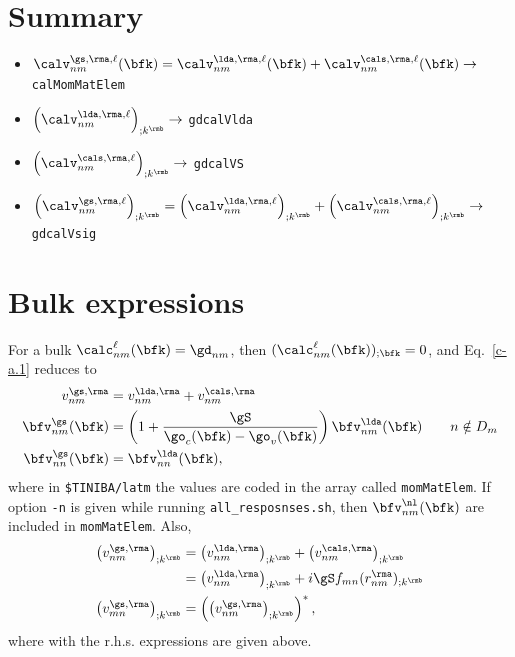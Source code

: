 \section{Summary}
\begin{itemize}
\item
$\calv^{\gs,\rma,\ell}_{nm}(\bfk)=\calv^{\lda,\rma,\ell}_{nm}(\bfk)+\calv^{\cals,\rma,\ell}_{nm}(\bfk)\to$
\verb=calMomMatElem= 

\item $\left(\calv^{\lda,\rma,\ell}_{nm}\right)_{;k^\rmb}\to$
\verb=gdcalVlda= 

\item $\left(\calv^{\cals,\rma,\ell}_{nm}\right)_{;k^\rmb}\to$ 
\verb=gdcalVS=

\item $\left(\calv^{\gs,\rma,\ell}_{nm}\right)_{;k^\rmb}=
\left(\calv^{\lda,\rma,\ell}_{nm}\right)_{;k^\rmb}+\left(\calv^{\cals,\rma,\ell}_{nm}\right)_{;k^\rmb}\to$ 
\verb=gdcalVsig=
\end{itemize}

\section{Bulk expressions}

For a bulk $\calc^\ell_{nm}(\bfk)=\gd_{nm}$, then
$(\calc^\ell_{nm}(\bfk))_{;\bfk}=0$, and Eq.~\eqref{c-a.1} reduces to
\begin{align}\label{choni.9}
v^{\gs,\rma}_{nm}
&=
v^{\lda,\rma}_{nm}
+
v^{\cals,\rma}_{nm}
\nonumber\\
\bfv^\gs_{nm}(\bfk)
&=
\left(1+\frac{\gS}{\go_c(\bfk)-\go_v(\bfk)}\right)\bfv^\lda_{nm}(\bfk)
\quad\quad n\notin D_m
\nonumber\\
\bfv^\gs_{nn}(\bfk)
&=
\bfv^\lda_{nn}(\bfk)
,
\end{align}
where in \verb=$TINIBA/latm= the values are coded in the array
called
\verb=momMatElem=.  
If option \verb=-n= is given while running
\verb=all_resposnses.sh=, then $\bfv^\nl_{nm}(\bfk)$ are included in 
\verb=momMatElem=. 
Also,
\begin{align}\label{c-a.1nn}
\left(v^{\gs,\rma}_{nm}\right)_{;k^\rmb}
&=
\left(
v^{\lda,\rma}_{nm}
\right)_{;k^\rmb}
+
\left(
v^{\cals,\rma}_{nm}
\right)_{;k^\rmb}
\nonumber\\
&=
\left(
v^{\lda,\rma}_{nm}
\right)_{;k^\rmb}
+
i\gS f_{mn}(r^\rma_{nm})_{;k^\rmb}
\nonumber\\
\left(v^{\gs,\rma}_{mn}\right)_{;k^\rmb}
&=
\left(\left(v^{\gs,\rma}_{nm}\right)_{;k^\rmb}\right)^*
,
\end{align}
where with the r.h.s. expressions are given above. 

